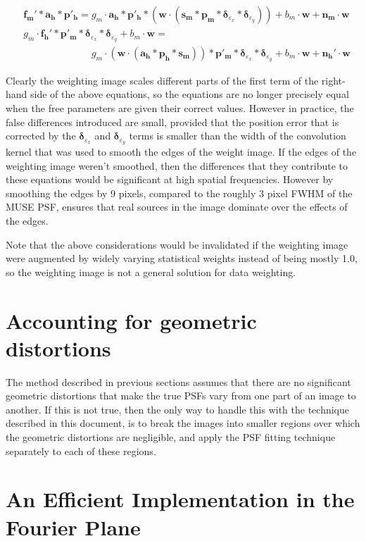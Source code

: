 \documentclass[12pt,twoside,a4paper]{article}
\newcommand{\msky}{\mathbf{s_m}}
\newcommand{\mpsf}{\mathbf{p_m}}
\newcommand{\hpsf}{\mathbf{p_h}}
\newcommand{\mepsf}{\mathbf{p'_m}}
\newcommand{\hepsf}{\mathbf{p'_h}}
\newcommand{\hlpf}{\mathbf{a_h}}
\newcommand{\mimg}{\mathbf{f_m}}
\newcommand{\himg}{\mathbf{f_h}}
\newcommand{\mnoise}{\mathbf{n_m}}
\newcommand{\hnoise}{\mathbf{n_h}}
\newcommand{\mdx}{\bm{\delta}_{\dx}}
\newcommand{\mdy}{\bm{\delta}_{\dy}}
\newcommand{\dx}{\varepsilon_x}
\newcommand{\dy}{\varepsilon_y}
\newcommand{\wt}{\bm{w}}
\newcommand{\mgain}{g_m}
\newcommand{\mbg}{b_m}
\begin{document}
\begin{align}
\label{muse_cal_eqn3}
&\mimg' \ast \hlpf \ast \hepsf = \mgain \cdot \hlpf \ast \hepsf \ast (\wt\cdot(\msky \ast \mpsf \ast \mdx \ast \mdy)) + \mbg\cdot\wt+\mnoise\cdot\wt\\
\label{hst_cal_eqn3}
&\mgain \cdot \himg' \ast \mepsf \ast \mdx
\ast \mdy + \mbg\cdot\wt = \nonumber \\
& \phantom{\mimg' \ast \hlpf \ast \hepsf ={}} \mgain\cdot(\wt\cdot(\hlpf \ast \hpsf \ast \msky)) \ast \mepsf \ast \mdx \ast \mdy + \mbg\cdot\wt + \hnoise'\cdot\wt
\end{align}

Clearly the weighting image scales different parts of the first term
of the right-hand side of the above equations, so the equations are no
longer precisely equal when the free parameters are given their
correct values. However in practice, the false differences introduced
are small, provided that the position error that is corrected by the
$\mdx$ and $\mdy$ terms is smaller than the width of the convolution
kernel that was used to smooth the edges of the weight image. If the
edges of the weighting image weren't smoothed, then the differences
that they contribute to these equations would be significant at high
spatial frequencies. However by smoothing the edges by 9 pixels,
compared to the roughly 3 pixel FWHM of the MUSE PSF, ensures that
real sources in the image dominate over the effects of the edges.

Note that the above considerations would be invalidated if the
weighting image were augmented by widely varying statistical weights
instead of being mostly 1.0, so the weighting image is not a general
solution for data weighting.

\section{Accounting for geometric distortions}

The method described in previous sections assumes that there are no
significant geometric distortions that make the true PSFs vary from
one part of an image to another. If this is not true, then the only
way to handle this with the technique described in this document, is
to break the images into smaller regions over which the geometric
distortions are negligible, and apply the PSF fitting technique
separately to each of these regions.

\section{An Efficient Implementation in the Fourier Plane}
\end{document}
